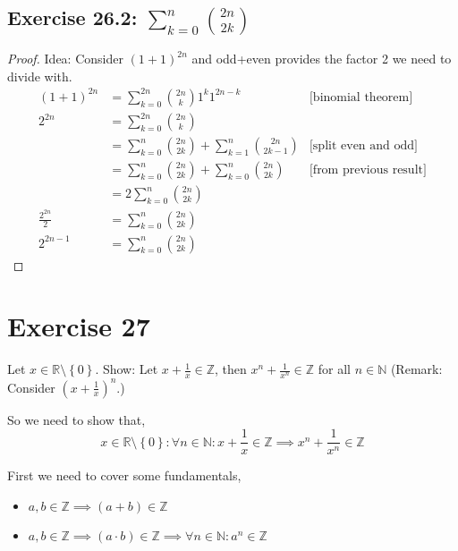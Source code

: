 \documentclass[a4paper]{article}
\theoremstyle{definition}
\newcommand\set[1]{\left\{#1\right\}}
\begin{document}
\subsection{Exercise 26.2: $\sum_{k=0}^n \binom{2n}{2k}$}

\begin{proof}
  Idea: Consider $(1+1)^{2n}$ and odd+even provides the factor 2 we need to divide with.
  \begin{align*}
    (1 + 1)^{2n} &= \sum_{k=0}^{2n} \binom{2n}{k} 1^k 1^{2n-k} & \text{[binomial theorem]} \\
          2^{2n} &= \sum_{k=0}^{2n} \binom{2n}{k} \\
                 &= \sum_{k=0}^{n} \binom{2n}{2k} + \sum_{k=1}^{n} \binom{2n}{2k-1} & \text{[split even and odd]} \\
                 &= \sum_{k=0}^{n} \binom{2n}{2k} + \sum_{k=0}^{n} \binom{2n}{2k} & \text{[from previous result]} \\
                 &= 2\sum_{k=0}^{n} \binom{2n}{2k} \\
    \frac{2^{2n}}{2} &= \sum_{k=0}^{n} \binom{2n}{2k} \\
        2^{2n-1} &= \sum_{k=0}^{n} \binom{2n}{2k}
  \end{align*}
\end{proof}

\section{Exercise 27}
\begin{ex}
  Let $x \in \mathbb R \setminus \set{0}$. Show:
  Let $x + \frac1x \in \mathbb{Z}$, then $x^n + \frac1{x^n} \in \mathbb{Z}$
  for all $n \in \mathbb{N}$ (Remark: Consider $(x + \frac1x)^n$.)
\end{ex}

So we need to show that,
\[
  x \in \mathbb{R} \setminus \set{0}: \forall n \in \mathbb N:
  x + \frac1x \in \mathbb Z \implies x^n + \frac1{x^n} \in \mathbb Z
\]

First we need to cover some fundamentals,
\begin{itemize}
  \item $a, b \in \mathbb Z \implies (a + b) \in \mathbb Z$
  \item $a, b \in \mathbb Z \implies (a \cdot b) \in \mathbb Z \implies \forall n \in \mathbb N: a^n \in \mathbb Z$
\end{itemize}
\end{document}

